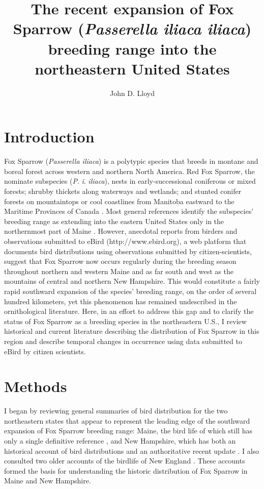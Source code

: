 \documentclass[fleqn,10pt,lineno]{wlpeerj} %
\title{The recent expansion of Fox Sparrow (\textit{Passerella iliaca iliaca}) breeding range into the northeastern United States}
\author[1]{John D. Lloyd}
\affil[1]{Vermont Center for Ecostudies, Norwich, VT, USA}
\begin{document}
\flushbottom
\maketitle
\thispagestyle{empty}

\section*{Introduction}
Fox Sparrow (\textit{Passerella iliaca}) is a polytypic species that breeds in montane and boreal forest across western and northern North America. Red Fox Sparrow, the nominate subspecies (\textit{P}. \textit{i}. \textit{iliaca}), nests in early-successional coniferous or mixed forests; shrubby thickets along waterways and wetlands; and stunted conifer forests on mountaintops or cool coastlines from Manitoba eastward to the Maritime Provinces of Canada \citep{Bisson1996-mp,McLaren2007-go,Stewart2015-id,Artuso2018-kd}. Most general references identify the subspecies’ breeding range as extending into the eastern United States only in the northernmost part of Maine \citep{Rising1996-sy,Sibley2000-rs,Weckstein2002-px}. However, anecdotal reports from birders and observations submitted to eBird (http://www.ebird.org), a web platform that documents bird distributions using observations submitted by citizen-scientists, suggest that Fox Sparrow now occurs regularly during the breeding season throughout northern and western Maine and as far south and west as the mountains of central and northern New Hampshire. This would constitute a fairly rapid southward expansion of the species’ breeding range, on the order of several hundred kilometers, yet this phenomenon has remained undescribed in the ornithological literature. Here, in an effort to address this gap and to clarify the status of Fox Sparrow as a breeding species in the northeastern U.S., I review historical and current literature describing the distribution of Fox Sparrow in this region and describe temporal changes in occurrence using data submitted to eBird by citizen scientists. 

\section*{Methods}
I began by reviewing general summaries of bird distribution for the two northeastern states that appear to represent the leading edge of the southward expansion of Fox Sparrow breeding range: Maine, the bird life of which still has only a single definitive reference \citep{Palmer1949-ig}, and New Hampshire, which has both an historical account of bird distributions \citep{Allen1903-xq} and an authoritative recent update \citep{Keith2013-gt}. I also consulted two older accounts of the birdlife of New England \citep{Samuels1875-jo,Forbush1929-pq}. These accounts formed the basis for understanding the historic distribution of Fox Sparrow in Maine and New Hampshire. 
\end{document}

